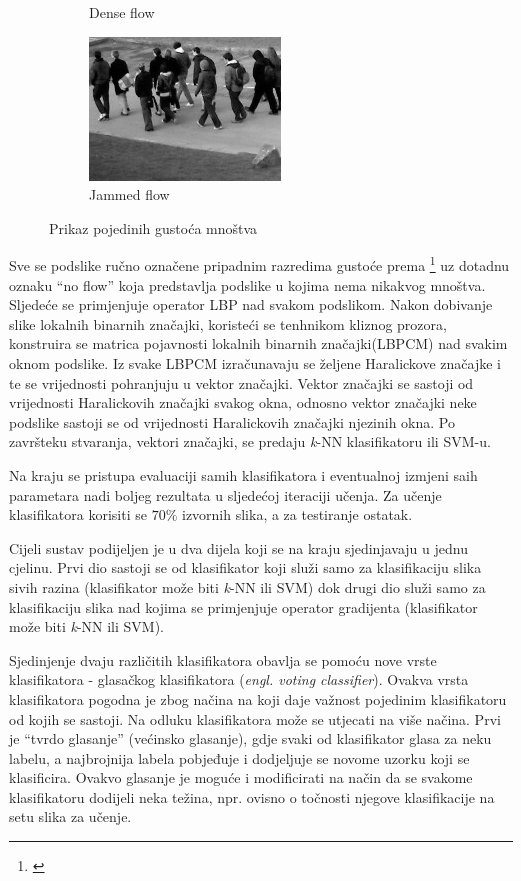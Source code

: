 \documentclass[times, utf8, zavrsni]{fer}
\begin{document}
\begin{figure}[ht]
\begin{subfigure}[b]{0.19\linewidth}
		\caption{Dense flow}
	\end{subfigure}
	\begin{subfigure}[b]{0.19\linewidth}
		\centering
		\includegraphics[scale=0.5]{img/jammedflow.jpg}
		\caption{Jammed flow}
	\end{subfigure}
\caption{Prikaz pojedinih gustoća mnoštva}
\end{figure}

Sve se podslike ručno označene pripadnim razredima gustoće prema
\footnote{\cite{polus}} uz dotadnu oznaku \enquote{no flow} koja 
predstavlja podslike u kojima nema nikakvog mnoštva. Sljedeće se primjenjuje
operator LBP nad svakom podslikom. Nakon dobivanje slike lokalnih binarnih 
značajki, koristeći se tenhnikom kliznog prozora, konstruira se matrica 
pojavnosti lokalnih binarnih značajki(LBPCM) nad svakim oknom podslike. 
Iz svake LBPCM izračunavaju se željene Haralickove značajke i te se vrijednosti
pohranjuju u vektor značajki. Vektor značajki se sastoji od vrijednosti
Haralickovih značajki svakog okna, odnosno vektor značajki neke podslike 
sastoji se od vrijednosti Haralickovih značajki njezinih okna. Po završteku 
stvaranja, vektori značajki, se predaju \textit{k}-NN klasifikatoru ili SVM-u.

\bigbreak

Na kraju se pristupa evaluaciji samih klasifikatora i eventualnoj izmjeni
saih parametara nadi boljeg rezultata u sljedećoj iteraciji učenja. Za učenje
klasifikatora korisiti se \(70\%\) izvornih slika, a za testiranje ostatak.

\bigbreak

Cijeli sustav podijeljen je u dva dijela koji se na kraju sjedinjavaju u 
jednu cjelinu. Prvi dio sastoji se od klasifikator koji služi samo za 
klasifikaciju slika sivih razina (klasifikator može biti \textit{k}-NN ili SVM)
dok drugi dio služi samo za klasifikaciju slika nad kojima se primjenjuje
operator gradijenta (klasifikator može biti \textit{k}-NN ili SVM).

\bigbreak

Sjedinjenje dvaju različitih klasifikatora obavlja se pomoću nove vrste
klasifikatora - glasačkog klasifikatora (\textit{engl. voting classifier}).
Ovakva vrsta klasifikatora pogodna je zbog načina na koji daje važnost pojedinim
klasifikatoru od kojih se sastoji. Na odluku klasifikatora može se utjecati
na više načina. Prvi je \enquote{tvrdo glasanje} (većinsko glasanje), gdje svaki od klasifikator glasa
za neku labelu, a najbrojnija labela pobjeđuje i dodjeljuje se novome uzorku 
koji se klasificira. Ovakvo glasanje je moguće i modificirati na način da 
se svakome klasifikatoru dodijeli neka težina, npr. ovisno o točnosti njegove
klasifikacije na setu slika za učenje.
\end{document}
